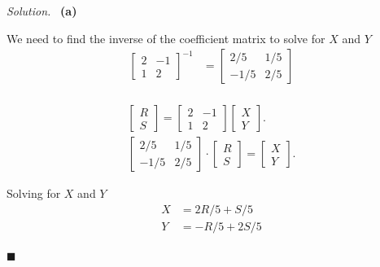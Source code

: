 \documentclass[11pt]{article}
\newenvironment{solution}
{\par\medskip\noindent\textit{Solution.}\ }
{\hfill$\blacksquare$\par\medskip}
\begin{document}
    \begin{solution}
        \textbf{(a)}

        We need to find the inverse of the coefficient matrix to solve for $X$ and $Y$
        \begin{align*}
            \begin{bmatrix}
                2 & -1 \\ 1 & 2
            \end{bmatrix} ^ {-1} &= \begin{bmatrix}
                2/5 & 1/5 \\
                -1/5 & 2/5
            \end{bmatrix} \\
        \end{align*}

        \begin{align*}
            \begin{bmatrix}
                R \\ S
            \end{bmatrix}
            = \begin{bmatrix}
                  2 & -1 \\ 1 & 2
            \end{bmatrix}
            \begin{bmatrix}
                X \\ Y
            \end{bmatrix}. \\
            \begin{bmatrix}
                2/5 & 1/5 \\
                -1/5 & 2/5
            \end{bmatrix} \cdot
            \begin{bmatrix}
                R \\ S
            \end{bmatrix}
            =
            \begin{bmatrix}
                X \\ Y
            \end{bmatrix}.
        \end{align*}

        Solving for $X$ and $Y$
        \begin{align*}
            X &= 2R/5 + S/5 \\
            Y &= -R/5 + 2S/5
        \end{align*}


\end{solution}
\end{document}
